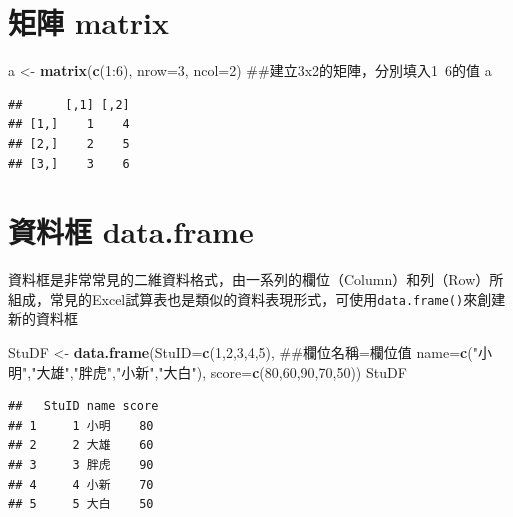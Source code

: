 \documentclass[]{book}
\newenvironment{Shaded}{\begin{snugshade}}{\end{snugshade}}
\newcommand{\KeywordTok}[1]{\textcolor[rgb]{0.13,0.29,0.53}{\textbf{{#1}}}}
\newcommand{\DataTypeTok}[1]{\textcolor[rgb]{0.13,0.29,0.53}{{#1}}}
\newcommand{\DecValTok}[1]{\textcolor[rgb]{0.00,0.00,0.81}{{#1}}}
\newcommand{\StringTok}[1]{\textcolor[rgb]{0.31,0.60,0.02}{{#1}}}
\newcommand{\NormalTok}[1]{{#1}}
\theoremstyle{definition}
\theoremstyle{definition}
\theoremstyle{remark}
\begin{document}
\section{矩陣 matrix}\label{-matrix}

\begin{Shaded}
\begin{Highlighting}[]
\NormalTok{a <-}\StringTok{ }\KeywordTok{matrix}\NormalTok{(}\KeywordTok{c}\NormalTok{(}\DecValTok{1}\NormalTok{:}\DecValTok{6}\NormalTok{), }\DataTypeTok{nrow=}\DecValTok{3}\NormalTok{, }\DataTypeTok{ncol=}\DecValTok{2}\NormalTok{) ##建立3x2的矩陣，分別填入1~6的值}
\NormalTok{a}
\end{Highlighting}
\end{Shaded}

\begin{verbatim}
##      [,1] [,2]
## [1,]    1    4
## [2,]    2    5
## [3,]    3    6
\end{verbatim}

\section{資料框 data.frame}\label{-data.frame}

資料框是非常常見的二維資料格式，由一系列的欄位（Column）和列（Row）所組成，常見的Excel試算表也是類似的資料表現形式，可使用\texttt{data.frame()}來創建新的資料框

\begin{Shaded}
\begin{Highlighting}[]
\NormalTok{StuDF <-}\StringTok{ }\KeywordTok{data.frame}\NormalTok{(}\DataTypeTok{StuID=}\KeywordTok{c}\NormalTok{(}\DecValTok{1}\NormalTok{,}\DecValTok{2}\NormalTok{,}\DecValTok{3}\NormalTok{,}\DecValTok{4}\NormalTok{,}\DecValTok{5}\NormalTok{), ##欄位名稱=欄位值}
                  \DataTypeTok{name=}\KeywordTok{c}\NormalTok{(}\StringTok{"小明"}\NormalTok{,}\StringTok{"大雄"}\NormalTok{,}\StringTok{"胖虎"}\NormalTok{,}\StringTok{"小新"}\NormalTok{,}\StringTok{"大白"}\NormalTok{),}
                  \DataTypeTok{score=}\KeywordTok{c}\NormalTok{(}\DecValTok{80}\NormalTok{,}\DecValTok{60}\NormalTok{,}\DecValTok{90}\NormalTok{,}\DecValTok{70}\NormalTok{,}\DecValTok{50}\NormalTok{))}
\NormalTok{StuDF }
\end{Highlighting}
\end{Shaded}

\begin{verbatim}
##   StuID name score
## 1     1 小明    80
## 2     2 大雄    60
## 3     3 胖虎    90
## 4     4 小新    70
## 5     5 大白    50
\end{verbatim}
\end{document}
